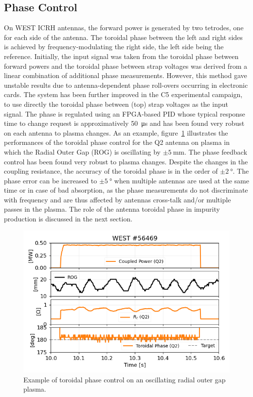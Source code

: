\documentclass[12p]{iopart}
\begin{document}
\subsection{Phase Control}

On WEST ICRH antennas, the forward power is generated by two tetrodes\cite{kuus1989}, one for each side of the antenna. The toroidal phase between the left and right sides is achieved by frequency-modulating the right side, the left side being the reference. Initially, the input signal was taken from the toroidal phase between forward powers and the toroidal phase between strap voltages was derived from a linear combination of additional phase measurements. However, this method gave unstable results due to antenna-dependent phase roll-overs occurring in electronic cards. The system has been further improved in the C5 experimental campaign, to use directly the toroidal phase between (top) strap voltages as the input signal. The phase is regulated using an FPGA-based PID whose typical response time to change request is approximatively \SI{50}{\micro\second} and has been found very robust on each antenna to plasma changes. As an example, figure~\ref{fig:westic56469phasecontrol} illustrates the performances of the toroidal phase control for the Q2 antenna on plasma in which the Radial Outer Gap (ROG) is oscillating by $\pm\SI{5}{\milli\meter}$. The phase feedback control has been found very robust to plasma changes. Despite the changes in the coupling resistance, the accuracy of the toroidal phase is in the order of $\pm\SI{2}{\degree}$. The phase error can be increased to $\pm\SI{5}{\degree}$ when multiple antennas are used at the same time or in case of bad absorption, as the phase measurements do not discriminate with frequency and are thus affected by antennas cross-talk and/or multiple passes in the plasma. The role of the antenna toroidal phase in impurity production is discussed in the next section. 

\begin{figure}
	\centering
	\includegraphics[width=0.95\linewidth]{figures/WEST_IC_56469_Phase_Control}
	\caption{Example of toroidal phase control on an oscillating radial outer gap plasma.}
	\label{fig:westic56469phasecontrol}
\end{figure}
\end{document}
